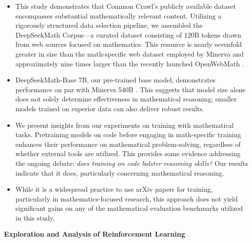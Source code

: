 \begin{itemize}[topsep=0pt]
    \item This study demonstrates that Common Crawl’s publicly available dataset encompasses substantial mathematically relevant content. Utilizing a rigorously structured data selection pipeline, we assembled the DeepSeekMath Corpus—a curated dataset consisting of 120B tokens drawn from web sources focused on mathematics. This resource is nearly sevenfold greater in size than the math-specific web dataset employed by Minerva \citep{minerva} and approximately nine times larger than the recently launched OpenWebMath \citep{openwebmath}.

\item DeepSeekMath-Base 7B, our pre-trained base model, demonstrates performance on par with Minerva 540B \citep{minerva}. This suggests that model size alone does not solely determine effectiveness in mathematical reasoning; smaller models trained on superior data can also deliver robust results.

\item We present insights from our experiments on training with mathematical tasks. Pretraining models on code before engaging in math-specific training enhances their performance on mathematical problem-solving, regardless of whether external tools are utilized. This provides some evidence addressing the ongoing debate: \textit{does training on code bolster reasoning skills?} Our results indicate that it does, particularly concerning mathematical reasoning.

\item While it is a widespread practice to use arXiv papers for training, particularly in mathematics-focused research, this approach does not yield significant gains on any of the mathematical evaluation benchmarks utilized in this study.
\end{itemize}

\textbf{Exploration and Analysis of Reinforcement Learning}

